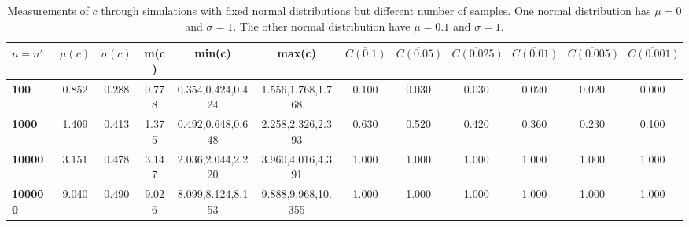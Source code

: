 \begin{table*}[h!]
\begin{center}
\begin{tabular}{| l | c | c | c | c | c | c | c | c | c | c | c |}\hline
$n=n'$ & $\mu(c)$ & $\sigma(c)$ & m(c) & min(c) & max(c) & $\overline{C(0.1)}$ & $\overline{C(0.05)}$ & $\overline{C(0.025)}$ & $\overline{C(0.01)}$ & $\overline{C(0.005)}$ & $\overline{C(0.001)}$ \\\hline\hline
{\bf 100} & 0.852 & 0.288 & 0.778 & 0.354,0.424,0.424 & 1.556,1.768,1.768 & 0.100 & 0.030 & 0.030 & 0.020 & 0.020 & 0.000 \\\hline
{\bf 1000} & 1.409 & 0.413 & 1.375 & 0.492,0.648,0.648 & 2.258,2.326,2.393 & 0.630 & 0.520 & 0.420 & 0.360 & 0.230 & 0.100 \\\hline
{\bf 10000} & 3.151 & 0.478 & 3.147 & 2.036,2.044,2.220 & 3.960,4.016,4.391 & 1.000 & 1.000 & 1.000 & 1.000 & 1.000 & 1.000 \\\hline
{\bf 100000} & 9.040 & 0.490 & 9.026 & 8.099,8.124,8.153 & 9.888,9.968,10.355 & 1.000 & 1.000 & 1.000 & 1.000 & 1.000 & 1.000 \\\hline
\end{tabular}
\caption{Measurements of $c$ through simulations
        with fixed normal distributions but different number of samples.
        One normal distribution has $\mu=0$ and $\sigma=1$.
        The other normal distribution have $\mu=0.1$ and $\sigma=1$.}
\end{center}
\end{table*}